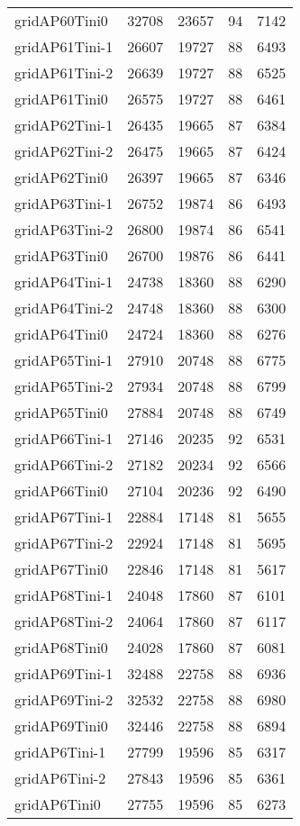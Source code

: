 \begin{tabular}{lrrrr}
gridAP60Tini0 & 32708 & 23657 & 94 & 7142 \\
gridAP61Tini-1 & 26607 & 19727 & 88 & 6493 \\
gridAP61Tini-2 & 26639 & 19727 & 88 & 6525 \\
gridAP61Tini0 & 26575 & 19727 & 88 & 6461 \\
gridAP62Tini-1 & 26435 & 19665 & 87 & 6384 \\
gridAP62Tini-2 & 26475 & 19665 & 87 & 6424 \\
gridAP62Tini0 & 26397 & 19665 & 87 & 6346 \\
gridAP63Tini-1 & 26752 & 19874 & 86 & 6493 \\
gridAP63Tini-2 & 26800 & 19874 & 86 & 6541 \\
gridAP63Tini0 & 26700 & 19876 & 86 & 6441 \\
gridAP64Tini-1 & 24738 & 18360 & 88 & 6290 \\
gridAP64Tini-2 & 24748 & 18360 & 88 & 6300 \\
gridAP64Tini0 & 24724 & 18360 & 88 & 6276 \\
gridAP65Tini-1 & 27910 & 20748 & 88 & 6775 \\
gridAP65Tini-2 & 27934 & 20748 & 88 & 6799 \\
gridAP65Tini0 & 27884 & 20748 & 88 & 6749 \\
gridAP66Tini-1 & 27146 & 20235 & 92 & 6531 \\
gridAP66Tini-2 & 27182 & 20234 & 92 & 6566 \\
gridAP66Tini0 & 27104 & 20236 & 92 & 6490 \\
gridAP67Tini-1 & 22884 & 17148 & 81 & 5655 \\
gridAP67Tini-2 & 22924 & 17148 & 81 & 5695 \\
gridAP67Tini0 & 22846 & 17148 & 81 & 5617 \\
gridAP68Tini-1 & 24048 & 17860 & 87 & 6101 \\
gridAP68Tini-2 & 24064 & 17860 & 87 & 6117 \\
gridAP68Tini0 & 24028 & 17860 & 87 & 6081 \\
gridAP69Tini-1 & 32488 & 22758 & 88 & 6936 \\
gridAP69Tini-2 & 32532 & 22758 & 88 & 6980 \\
gridAP69Tini0 & 32446 & 22758 & 88 & 6894 \\
gridAP6Tini-1 & 27799 & 19596 & 85 & 6317 \\
gridAP6Tini-2 & 27843 & 19596 & 85 & 6361 \\
gridAP6Tini0 & 27755 & 19596 & 85 & 6273 \\

\end{tabular}
